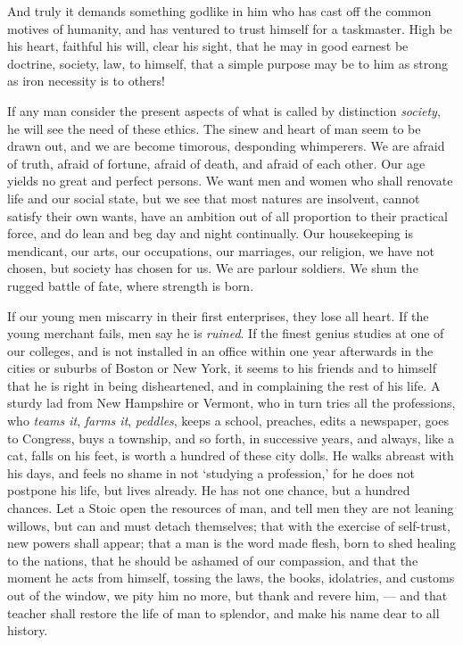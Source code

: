 \documentclass[12pt]{article}
\begin{document}
And truly it demands something godlike in him who has cast off the common
motives of humanity, and has ventured to trust himself for a taskmaster.
High be his heart, faithful his will, clear his sight, that he may in good
earnest be doctrine, society, law, to himself, that a simple purpose may be
to him as strong as iron necessity is to others!

If any man consider the present aspects of what is called by distinction
{\it society}, he will see the need of these ethics. The sinew and heart of man
seem to be drawn out, and we are become timorous, desponding whimperers. We
are afraid of truth, afraid of fortune, afraid of death, and afraid of each
other. Our age yields no great and perfect persons. We want men and women
who shall renovate life and our social state, but we see that most natures
are insolvent, cannot satisfy their own wants, have an ambition out of all
proportion to their practical force, and do lean and beg day and night
continually. Our housekeeping is mendicant, our arts, our occupations, our
marriages, our religion, we have not chosen, but society has chosen for us.
We are parlour soldiers. We shun the rugged battle of fate, where strength
is born.

If our young men miscarry in their first enterprises, they lose all heart.
If the young merchant fails, men say he is {\it ruined}. If the finest genius
studies at one of our colleges, and is not installed in an office within one
year afterwards in the cities or suburbs of Boston or New York, it seems to
his friends and to himself that he is right in being disheartened, and in
complaining the rest of his life. A sturdy lad from New Hampshire or
Vermont, who in turn tries all the professions, who {\it teams it},
{\it farms it}, {\it peddles}, keeps a school, preaches,
edits a newspaper, goes to Congress,
buys a township, and so forth, in successive years, and always, like a cat,
falls on his feet, is worth a hundred of these city dolls. He walks abreast
with his days, and feels no shame in not `studying a profession,' for he
does not postpone his life, but lives already. He has not one chance, but a
hundred chances. Let a Stoic open the resources of man, and tell men they
are not leaning willows, but can and must detach themselves; that with the
exercise of self-trust, new powers shall appear; that a man is the word made
flesh, born to shed healing to the nations, that he should be ashamed of our
compassion, and that the moment he acts from himself, tossing the laws, the
books, idolatries, and customs out of the window, we pity him no more, but
thank and revere him, --- and that teacher shall restore the life of man to
splendor, and make his name dear to all history.
\end{document}
